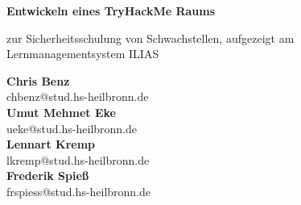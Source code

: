 \documentclass[10pt, a4paper,onecolumn ,titlepage]{article}
\begin{document}
    \begin{titlepage}
        \begin{center}

            \vspace*{1cm}

            {\large \textbf{Entwickeln eines TryHackMe Raums}}

            \vspace{0.5cm}
            zur Sicherheitsschulung von Schwachstellen, aufgezeigt am Lernmanagementsystem ILIAS

            \vspace{1.5cm}

            \textbf{Chris Benz} \\
            \small{chbenz@stud.hs-heilbronn.de}
            \\
            \vspace{0.2cm}
            \textbf{Umut Mehmet Eke}\\
            \small{ueke@stud.hs-heilbronn.de}
            \\
            \vspace{0.2cm}
            \textbf{Lennart Kremp} \\
            \small{lkremp@stud.hs-heilbronn.de}
            \\
            \vspace{0.2cm}
            \textbf{Frederik Spieß}\\
            \small{frspiess@stud.hs-heilbronn.de}


            \vfill


\end{center}
\end{titlepage}
\end{document}

